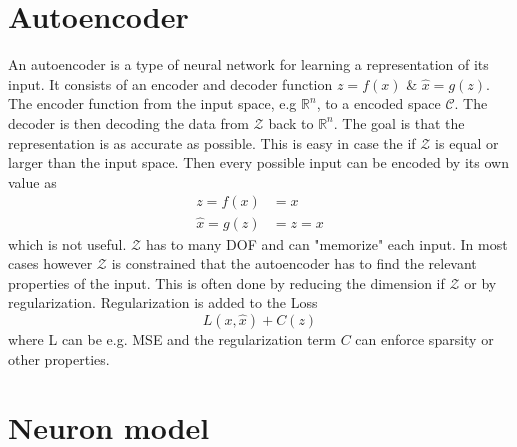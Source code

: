 \section{Autoencoder}
An autoencoder is a type of neural network for learning a representation of its input. It consists of an encoder and decoder function $z =f(x)$ \& $\hat{x} = g(z)$. The encoder function from the input space, e.g $\mathbb{R}^n$, to a encoded space $\mathcal{C}$. The decoder is then decoding the data from $\mathcal{Z}$ back to $\mathbb{R}^n$. The goal is that the representation is as accurate as possible. This is easy in case the if $\mathcal{Z}$ is equal or larger than the input space. Then every possible input can be encoded by its own value as
\begin{equation}
\begin{aligned}
 	z = f(x) &= x\\
 	\hat{x} = g(z) &= z = x
\end{aligned}
\end{equation}
which is not useful. $\mathcal{Z}$ has to many DOF and can "memorize" each input. In most cases however $\mathcal{Z}$ is constrained that the autoencoder has to find the relevant properties of the input. This is often done by reducing the dimension if $\mathcal{Z}$ or by regularization. Regularization is added to the Loss
\begin{equation}
	L(x,\hat{x}) + C(z)
\end{equation}
where L can be e.g. MSE and the regularization term $C$ can enforce sparsity or other properties\cite{goodfellow_deep_2016}.

\section{Neuron model}


